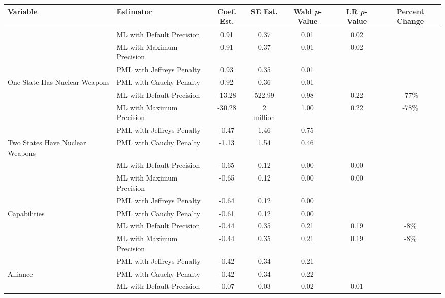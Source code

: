 
\begin{tabular}{llccccc}
\toprule
Variable & Estimator & Coef. Est. & SE Est. & Wald \textit{p}-Value & LR \textit{p}-Value & Percent Change\\
\midrule
 & ML with Default Precision & 0.91 & 0.37 & 0.01 & 0.02 & \\

 & ML with Maximum Precision & 0.91 & 0.37 & 0.01 & 0.02 & \\

 & PML with Jeffreys Penalty & 0.93 & 0.35 & 0.01 &  & \\

\multirow{-4}{*}{\raggedright\arraybackslash One State Has Nuclear Weapons} & PML with Cauchy Penalty & 0.92 & 0.36 & 0.01 &  & \\
\cmidrule{1-7}
 & ML with Default Precision & -13.28 & 522.99 & 0.98 & 0.22 & -77\%\\

 & ML with Maximum Precision & -30.28 & 2 million & 1.00 & 0.22 & -78\%\\

 & PML with Jeffreys Penalty & -0.47 & 1.46 & 0.75 &  & \\

\multirow{-4}{*}{\raggedright\arraybackslash Two States Have Nuclear Weapons} & PML with Cauchy Penalty & -1.13 & 1.54 & 0.46 &  & \\
\cmidrule{1-7}
 & ML with Default Precision & -0.65 & 0.12 & 0.00 & 0.00 & \\

 & ML with Maximum Precision & -0.65 & 0.12 & 0.00 & 0.00 & \\

 & PML with Jeffreys Penalty & -0.64 & 0.12 & 0.00 &  & \\

\multirow{-4}{*}{\raggedright\arraybackslash Capabilities} & PML with Cauchy Penalty & -0.61 & 0.12 & 0.00 &  & \\
\cmidrule{1-7}
 & ML with Default Precision & -0.44 & 0.35 & 0.21 & 0.19 & -8\%\\

 & ML with Maximum Precision & -0.44 & 0.35 & 0.21 & 0.19 & -8\%\\

 & PML with Jeffreys Penalty & -0.42 & 0.34 & 0.21 &  & \\

\multirow{-4}{*}{\raggedright\arraybackslash Alliance} & PML with Cauchy Penalty & -0.42 & 0.34 & 0.22 &  & \\
\cmidrule{1-7}
 & ML with Default Precision & -0.07 & 0.03 & 0.02 & 0.01 & \\


\end{tabular}
